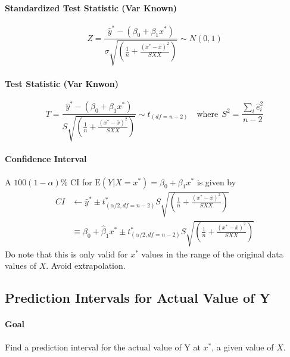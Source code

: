 \documentclass[11pt]{article}
\begin{document}
\paragraph{Standardized Test Statistic (Var Known)}
\begin{equation*}
    Z=\frac{\hat{y}^{*}-\left(\beta_{0}+\beta_{1} x^{*}\right)}{\sigma \sqrt{\left(\frac{1}{n}+\frac{\left(x^{*}-\bar{x}\right)^{2}}{S X X}\right)}} \sim N(0,1)
\end{equation*}

\paragraph{Test Statistic (Var Knwon)}
\begin{equation*}
    T=\frac{\hat{y}^*-\left(\beta_{0}+\beta_{1} x^{*}\right)}{S \sqrt{\left(\frac{1}{n}+\frac{\left(x^{*}-\bar{x}\right)^{2}}{S X X}\right)}} \sim t_{(df=n-2)} \quad \text{where}~~S^2 = \frac{\sum_i \hat{e}_i^2}{n-2} 
\end{equation*}

\paragraph{Confidence Interval} A $100 (1 - \alpha) \%$ CI for $\mathrm{E}\left(Y | X=x^{*}\right)=\beta_{0}+\beta_{1} x^{*}$ is given by
\begin{align*}
    CI &\gets \hat{y}^{*} \pm t^\ast_{(\alpha / 2, df = n-2)} S \sqrt{\left(\frac{1}{n}+\frac{\left(x^{*}-\bar{x}\right)^{2}}{S X X}\right)} \\
    &\equiv \hat{\beta}_{0}+\hat{\beta}_{1} x^{*} \pm t^\ast_{(\alpha / 2, df =n-2)} S \sqrt{\left(\frac{1}{n}+\frac{\left(x^{*}-\bar{x}\right)^{2}}{S X X}\right)}
\end{align*}
\color{Thistle} 
Do note that this is only valid for $x^\ast$ values in the range of the original data values of $X$. Avoid extrapolation.
\color{Black}

\subsection{Prediction Intervals for Actual Value of Y}
\paragraph{Goal} Find a prediction interval for the actual value of Y at $x^*$, a given value of $X$.
\end{document}
